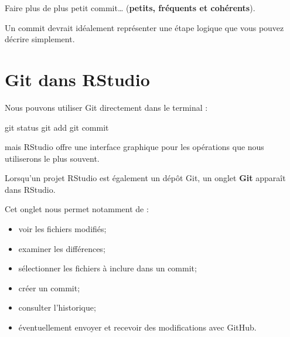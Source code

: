 \documentclass[
  letterpaper,
  DIV=11,
  numbers=noendperiod]{scrreprt}
\newenvironment{Shaded}{\begin{snugshade}}{\end{snugshade}}
\newcommand{\FunctionTok}[1]{\textcolor[rgb]{0.28,0.35,0.67}{#1}}
\newcommand{\NormalTok}[1]{\textcolor[rgb]{0.00,0.23,0.31}{#1}}
\providecommand{\tightlist}{%
  \setlength{\itemsep}{0pt}\setlength{\parskip}{0pt}}\usepackage{longtable,booktabs,array}
\begin{document}
\begin{tcolorbox}[enhanced jigsaw, arc=.35mm, title=\textcolor{quarto-callout-tip-color}{\faLightbulb}\hspace{0.5em}{Une bonne habitude}, colback=white, left=2mm, rightrule=.15mm, toptitle=1mm, opacityback=0, bottomtitle=1mm, breakable, colframe=quarto-callout-tip-color-frame, coltitle=black, toprule=.15mm, titlerule=0mm, opacitybacktitle=0.6, bottomrule=.15mm, colbacktitle=quarto-callout-tip-color!10!white, leftrule=.75mm]

Faire plus de plus petit commit\ldots{} (\textbf{petits, fréquents et
cohérents}).

Un commit devrait idéalement représenter une étape logique que vous
pouvez décrire simplement.

\end{tcolorbox}

\section{Git dans RStudio}\label{git-dans-rstudio}

Nous pouvons utiliser Git directement dans le terminal :

\begin{Shaded}
\begin{Highlighting}[]
\FunctionTok{git}\NormalTok{ status}
\FunctionTok{git}\NormalTok{ add}
\FunctionTok{git}\NormalTok{ commit}
\end{Highlighting}
\end{Shaded}

mais RStudio offre une interface graphique pour les opérations que nous
utiliserons le plus souvent.

Lorsqu'un projet RStudio est également un dépôt Git, un onglet
\textbf{Git} apparaît dans RStudio.

Cet onglet nous permet notamment de :

\begin{itemize}
\tightlist
\item
  voir les fichiers modifiés;
\item
  examiner les différences;
\item
  sélectionner les fichiers à inclure dans un commit;
\item
  créer un commit;
\item
  consulter l'historique;
\item
  éventuellement envoyer et recevoir des modifications avec GitHub.
\end{itemize}
\end{document}
